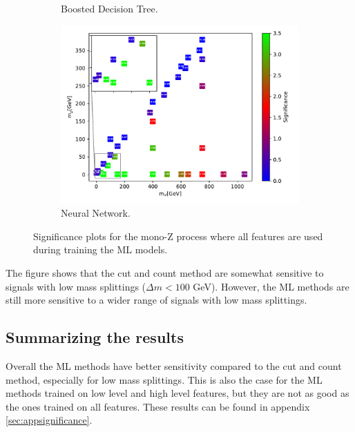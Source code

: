 \begin{figure}[H]
\begin{subfigure}[t!]{0.49\textwidth}
    \caption{Boosted Decision Tree.}
        \label{fig:signAllmonoZBDT}
    \end{subfigure}      
    \begin{subfigure}[t!]{0.49\textwidth}
    \includegraphics[width = \textwidth]{Figures/Significances/significance_NN_monoZ_All_level.pdf}
    \caption{Neural Network.}
        \label{fig:signAllmonoZNN}
    \end{subfigure}
    \caption{Significance plots for the mono-Z process where all features are used during training the ML models.}
    \label{fig:signAllmonoZ}
\end{figure}

The figure shows that the cut and count method are somewhat sensitive to signals with low mass splittings ($\Delta m < 100$ GeV). However, the ML methods are still more sensitive to a wider range of signals with low mass splittings. 



\subsection{Summarizing the results}
Overall the ML methods have better sensitivity compared to the cut and count method, especially for low mass splittings. This is also the case for the ML methods trained on low level and high level features, but they are not as good as the ones trained on all features. These results can be found in appendix \ref{sec:appsignificance}. 




